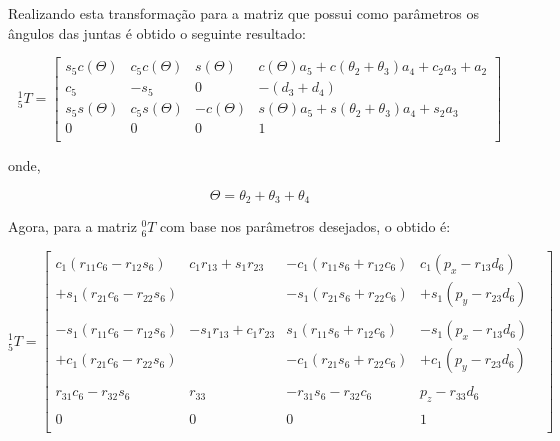 Realizando esta transformação para a matriz que possui como parâmetros os ângulos das juntas
é obtido o seguinte resultado:

\begin{equation*}
    ^1_5T = 
    \begin{bmatrix}
        s_5c(\Theta) & c_5c(\Theta) & s(\Theta) & c(\Theta)a_5 + c(\theta_2+\theta_3)a_4 + c_2a_3 + a_2 \\
        c_5 & -s_5 & 0 & -(d_3+d_4) \\
        s_5s(\Theta) & c_5s(\Theta) & -c(\Theta) & s(\Theta)a_5+s(\theta_2+\theta_3)a_4 + s_2a_3 \\
           0   &    0   &    0   &  1  \\    
    \end{bmatrix}
\end{equation*}

onde,

\begin{equation*}
    \Theta = \theta_2+\theta_3+\theta_4
\end{equation*}

Agora, para a matriz $^0_6T$ com base nos parâmetros desejados, o obtido é:

\begin{equation*}
    ^1_5T = 
    \begin{bmatrix}
         c_1(r_{11}c_6-r_{12}s_6) &  c_1r_{13}+s_1r_{23} & -c_1(r_{11}s_6+r_{12}c_6) &  c_1(p_x-r_{13}d_6) \\
        +s_1(r_{21}c_6-r_{22}s_6) &                      & -s_1(r_{21}s_6+r_{22}c_6) & +s_1(p_y-r_{23}d_6) \\
        & & & & \\
        -s_1(r_{11}c_6-r_{12}s_6) & -s_1r_{13}+c_1r_{23} &  s_1(r_{11}s_6+r_{12}c_6) & -s_1(p_x-r_{13}d_6) \\
        +c_1(r_{21}c_6-r_{22}s_6) &                      & -c_1(r_{21}s_6+r_{22}c_6) & +c_1(p_y-r_{23}d_6) \\
        & & & & \\        
             r_{31}c_6-r_{32}s_6  &         r_{33}       &     -r_{31}s_6-r_{32}c_6  &      p_z-r_{33}d_6  \\
        & & & & \\
                    0             &            0         &              0            &           1         \\    
    \end{bmatrix}
\end{equation*}

